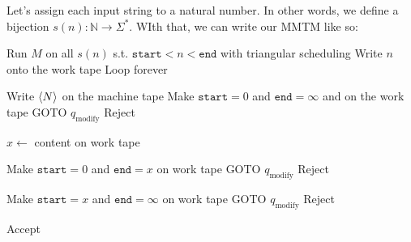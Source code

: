 \documentclass[12pt]{article}
\newcommand{\N}{\mathbb{N}}
\begin{document}
Let's assign each input string to a natural number.
In other words, we define a bijection $s(n): \N \to \Sigma^*$.
WIth that, we can write our MMTM like so:
\begin{algorithmic}[1]
            \State Run $M$ on all $s(n)$ s.t. $\texttt{start} < n < \texttt{end}$ with triangular scheduling
                \State Write $n$ onto the work tape
                \State \Return
            \Else
                \State Loop forever
            \EndIf
        \EndProcedure

        \item[]
        \State Write $\Braket{N}$ on the machine tape
        \State Make $\texttt{start}=0$ and $\texttt{end}=\infty$ and  on the work tape
        \State GOTO $q_{\text{modify}}$
            \State Reject
        \EndIf
     
        \item[]
        \State $x \gets$ content on work tape

        \item[]
        \State Make $\texttt{start}=0$ and $\texttt{end}=x$ on work tape
        \State GOTO $q_{\text{modify}}$
            \State Reject
        \EndIf

        \item[]
        \State Make $\texttt{start}=x$ and $\texttt{end}=\infty$ on work tape
        \State GOTO $q_{\text{modify}}$
            \State Reject
        \EndIf

        \item[]
        \State Accept
    \EndProcedure
\end{algorithmic}
\end{document}
